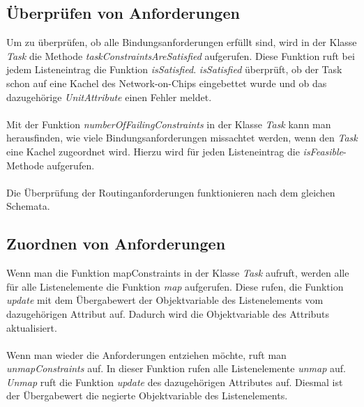 \subsection{Überprüfen von Anforderungen}
Um zu überprüfen, ob alle Bindungsanforderungen erfüllt sind, wird in der Klasse \textit{Task} die Methode \textit{taskConstraintsAreSatisfied} aufgerufen. Diese Funktion ruft bei jedem Listeneintrag die Funktion \textit{isSatisfied}. \textit{isSatisfied} überprüft, ob der Task schon auf eine Kachel des Network-on-Chips eingebettet wurde und ob das dazugehörige \textit{UnitAttribute} einen Fehler meldet.\\
\\
Mit der Funktion \textit{numberOfFailingConstraints} in der Klasse \textit{Task} kann man herausfinden, wie viele Bindungsanforderungen missachtet werden, wenn den \textit{Task} eine Kachel zugeordnet wird. Hierzu wird für jeden Listeneintrag die \textit{isFeasible}-Methode aufgerufen.\\
\\
Die Überprüfung der Routinganforderungen funktionieren nach dem gleichen Schemata.

\subsection{Zuordnen  von Anforderungen}
Wenn man die Funktion mapConstraints in der Klasse \textit{Task} aufruft, werden alle für alle Listenelemente die Funktion \textit{map} aufgerufen. Diese rufen, die Funktion \textit{update} mit dem Übergabewert der Objektvariable des Listenelements vom dazugehörigen Attribut auf. Dadurch wird die Objektvariable des Attributs aktualisiert.\\
\\
Wenn man wieder die Anforderungen entziehen möchte, ruft man \textit{unmapConstraints} auf. In dieser Funktion rufen alle Listenelemente \textit{unmap} auf. \textit{Unmap} ruft die Funktion \textit{update} des dazugehörigen Attributes auf. Diesmal ist der Übergabewert die negierte Objektvariable des Listenelements.